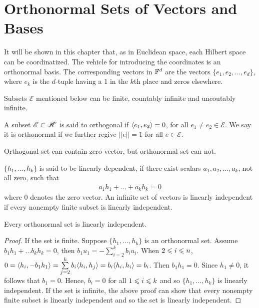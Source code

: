 \chapter{Orthonormal Sets of Vectors and Bases}\label{chp:1_4}



It will be shown in this chapter that, as in Euclidean space, each Hilbert 
space can be coordinatized. The vehicle for introducing the coordinates is 
an orthonormal basis. The corresponding vectors in $\mathbb{F}^d$ are the vectors 
$\{e_1, e_2, ... , e_d\}$, where $e_k$ is the $d$-tuple having a $1$ in the $k$th place and zeros elsewhere.

Subsets $\mathscr{E}$ mentioned below can be finite, countably infinite and uncoutably infinite. 

\begin{definition}{}{}
    A subset $\mathscr{E}\subset \mathscr{H}$ is said to orthogonal if $\langle e_1,e_2\rangle=0$, for all $e_1\neq e_2\in \mathscr{E}$. 
    We say it is orthonormal if we further regive $||e||=1$ for all $e\in \mathscr{E}$. 
\end{definition}

\begin{remark}
    Orthogonal set can contain zero vector, but orthonormal set can not. 
\end{remark}


\begin{definition}{}{}
    $\{h_1,..., h_k\}$ is said to be linearly dependent, if there exist scalars $a_1,a_2,...,a_k$, not all zero, such that
    \begin{align*}
        a_1h_1+...+a_kh_k=0
    \end{align*}
    where $0$ denotes the zero vector.
    An infinite set of vectors is linearly independent if every nonempty finite subset is linearly independent.
\end{definition}


\begin{corollary}{}{}
    Every orthonormal set is linearly independent.
\end{corollary}
\begin{proof}
    If the set is finite. Suppose $\{h_1,...,h_k\}$ is an orthonormal set. Assume $b_1h_1+...b_kh_k=0$, then $b_1u_1=-\sum\limits_{i=2}^{k}b_iu_i$. 
    When $2\leqslant i\leqslant n$, $0=\langle h_i,-b_1h_1\rangle=\sum\limits_{j=2}^{k}b_i\langle h_i,h_j\rangle
    =b_i\langle h_i,h_i\rangle=b_i$. Then $b_1h_1=0$.
    Since $h_1\neq 0$, it follows that $b_1=0$. Hence, $b_i=0$ for all $1\leqslant i\leqslant k$ and so $\{h_1,...,h_k\}$ is linearly independent.
    If the set is infinite, the above proof can show that every nonempty finite subset is linearly independent and so the set is linearly independent.
\end{proof}


